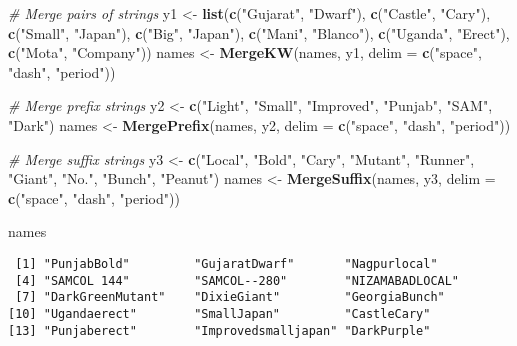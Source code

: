 \documentclass[
]{article}
\newenvironment{Shaded}{\begin{snugshade}}{\end{snugshade}}
\newcommand{\CommentTok}[1]{\textcolor[rgb]{0.56,0.35,0.01}{\textit{#1}}}
\newcommand{\DataTypeTok}[1]{\textcolor[rgb]{0.13,0.29,0.53}{#1}}
\newcommand{\KeywordTok}[1]{\textcolor[rgb]{0.13,0.29,0.53}{\textbf{#1}}}
\newcommand{\NormalTok}[1]{#1}
\newcommand{\StringTok}[1]{\textcolor[rgb]{0.31,0.60,0.02}{#1}}
\begin{document}
\begin{Shaded}
\begin{Highlighting}[]
\CommentTok{# Merge pairs of strings}
\NormalTok{y1 <-}\StringTok{ }\KeywordTok{list}\NormalTok{(}\KeywordTok{c}\NormalTok{(}\StringTok{"Gujarat"}\NormalTok{, }\StringTok{"Dwarf"}\NormalTok{), }\KeywordTok{c}\NormalTok{(}\StringTok{"Castle"}\NormalTok{, }\StringTok{"Cary"}\NormalTok{), }\KeywordTok{c}\NormalTok{(}\StringTok{"Small"}\NormalTok{, }\StringTok{"Japan"}\NormalTok{),}
           \KeywordTok{c}\NormalTok{(}\StringTok{"Big"}\NormalTok{, }\StringTok{"Japan"}\NormalTok{), }\KeywordTok{c}\NormalTok{(}\StringTok{"Mani"}\NormalTok{, }\StringTok{"Blanco"}\NormalTok{), }\KeywordTok{c}\NormalTok{(}\StringTok{"Uganda"}\NormalTok{, }\StringTok{"Erect"}\NormalTok{),}
           \KeywordTok{c}\NormalTok{(}\StringTok{"Mota"}\NormalTok{, }\StringTok{"Company"}\NormalTok{))}
\NormalTok{names <-}\StringTok{ }\KeywordTok{MergeKW}\NormalTok{(names, y1, }\DataTypeTok{delim =} \KeywordTok{c}\NormalTok{(}\StringTok{"space"}\NormalTok{, }\StringTok{"dash"}\NormalTok{, }\StringTok{"period"}\NormalTok{))}

\CommentTok{# Merge prefix strings}
\NormalTok{y2 <-}\StringTok{ }\KeywordTok{c}\NormalTok{(}\StringTok{"Light"}\NormalTok{, }\StringTok{"Small"}\NormalTok{, }\StringTok{"Improved"}\NormalTok{, }\StringTok{"Punjab"}\NormalTok{, }\StringTok{"SAM"}\NormalTok{, }\StringTok{"Dark"}\NormalTok{)}
\NormalTok{names <-}\StringTok{ }\KeywordTok{MergePrefix}\NormalTok{(names, y2, }\DataTypeTok{delim =} \KeywordTok{c}\NormalTok{(}\StringTok{"space"}\NormalTok{, }\StringTok{"dash"}\NormalTok{, }\StringTok{"period"}\NormalTok{))}

\CommentTok{# Merge suffix strings}
\NormalTok{y3 <-}\StringTok{ }\KeywordTok{c}\NormalTok{(}\StringTok{"Local"}\NormalTok{, }\StringTok{"Bold"}\NormalTok{, }\StringTok{"Cary"}\NormalTok{, }\StringTok{"Mutant"}\NormalTok{, }\StringTok{"Runner"}\NormalTok{, }\StringTok{"Giant"}\NormalTok{, }\StringTok{"No."}\NormalTok{,}
        \StringTok{"Bunch"}\NormalTok{, }\StringTok{"Peanut"}\NormalTok{)}
\NormalTok{names <-}\StringTok{ }\KeywordTok{MergeSuffix}\NormalTok{(names, y3, }\DataTypeTok{delim =} \KeywordTok{c}\NormalTok{(}\StringTok{"space"}\NormalTok{, }\StringTok{"dash"}\NormalTok{, }\StringTok{"period"}\NormalTok{))}

\NormalTok{names}
\end{Highlighting}
\end{Shaded}

\begin{verbatim}
 [1] "PunjabBold"         "GujaratDwarf"       "Nagpurlocal"       
 [4] "SAMCOL 144"         "SAMCOL--280"        "NIZAMABADLOCAL"    
 [7] "DarkGreenMutant"    "DixieGiant"         "GeorgiaBunch"      
[10] "Ugandaerect"        "SmallJapan"         "CastleCary"        
[13] "Punjaberect"        "Improvedsmalljapan" "DarkPurple"        
\end{verbatim}
\end{document}
